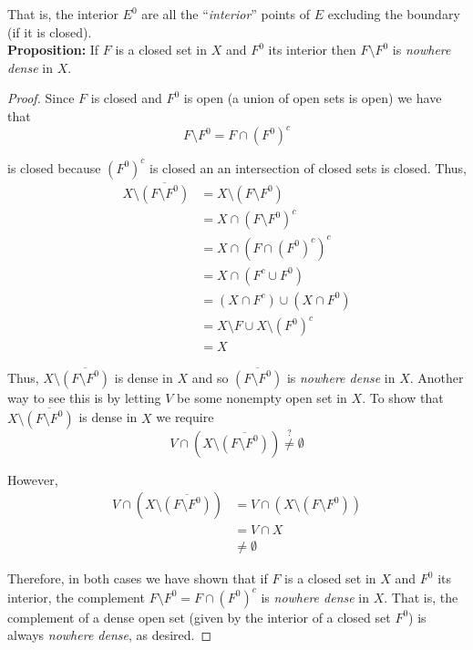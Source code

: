 \documentclass[12pt]{article}
\newlength\tindent
\renewcommand{\indent}{\hspace*{\tindent}}
\begin{document}
\indent That is, the interior $E^0$ are all the ``{\em interior}'' points of $E$ excluding the boundary (if it is closed). \\

%
%
{\bf Proposition:} If $F$ is a closed set in $X$ and $F^0$ its interior then $F\setminus F^0$ is {\em nowhere dense} in $X$.

\begin{proof} Since $F$ is closed and $F^0$ is open (a union of open sets is open) we have that
\begin{equation*}
	F \setminus F^0 = F \cap \left(F^0\right)^c
\end{equation*}

is closed because $\left(F^0\right)^c$ is closed an an intersection of closed sets is closed. Thus,
\begin{align*}
	X \setminus \overline{ \left( F \setminus F^0 \right) } &= 	X \setminus \left( F \setminus F^0 \right) \\
	&= X \cap \left( F \setminus F^0 \right)^c \\
	&= X \cap \left( F \cap \left(F^0\right)^c \right)^c \\
	&= X \cap \left( F^c \cup F^0 \right) \\
	&= \left( X \cap F^c \right) \cup \left( X \cap F^0 \right) \\
	&= X\setminus F \cup X\setminus \left(F^0\right)^c \\
	&= X
\end{align*}

\indent Thus, $X \setminus \overline{ \left( F \setminus F^0 \right) }$ is dense in $X$ and so $\overline{ \left( F \setminus F^0 \right) }$ is {\em nowhere dense} in $X$. Another way to see this is by letting $V$ be some nonempty open set in $X$. To show that $X \setminus \overline{ \left( F \setminus F^0 \right) }$ is dense in $X$ we require
\begin{equation*}
	V \cap \left( X \setminus \overline{ \left( F \setminus F^0 \right) } \right) \stackrel{?}{\neq} \emptyset
\end{equation*}

However, 
\begin{align*}
	V \cap \left( X \setminus \overline{ \left( F \setminus F^0 \right) } \right) &= V \cap \left( X \setminus \left( F \setminus F^0 \right) \right) \\
	&= V \cap X \\
	&\neq \emptyset
\end{align*}

\indent Therefore, in both cases we have shown that if $F$ is a closed set in $X$ and $F^0$ its interior, the complement $F\setminus F^0 = F\cap\left(F^0\right)^c$ is {\em nowhere dense} in $X$. That is, the complement of a dense open set (given by the interior of a closed set $F^0$) is always {\em nowhere dense}, as desired.
\end{proof}
\end{document}
